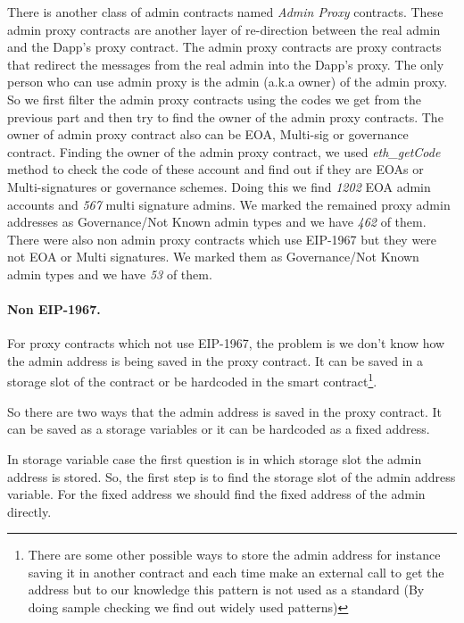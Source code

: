 There is another class of admin contracts named \textit{Admin Proxy} contracts. These admin proxy contracts are another layer of re-direction between the real admin and the Dapp's proxy contract. The admin proxy contracts are proxy contracts that redirect the messages from the real admin into the Dapp's proxy. The only person who can use admin proxy is the admin (a.k.a owner) of the admin proxy. So we first filter the admin proxy contracts using the codes we get from the previous part and then try to find the owner of the admin proxy contracts. The owner of admin proxy contract also can be EOA, Multi-sig or governance contract. Finding the owner of the admin proxy contract, we used \textit{eth\_getCode} method to check the code of these account and find out if they are EOAs or Multi-signatures or governance schemes. Doing this we find \textit{1202} EOA admin accounts and \textit{567} multi signature admins. We marked the remained proxy admin addresses as Governance/Not Known admin types and we have \textit{462} of them. There were also non admin proxy contracts which use EIP-1967 but they were not EOA or Multi signatures. We marked them as Governance/Not Known admin types and we have \textit{53} of them.


\paragraph{Non EIP-1967.}


For proxy contracts which not use EIP-1967, the problem is we don't know how the admin address is being saved in the proxy contract. It can be saved in a storage slot of the contract or be hardcoded in the smart contract\footnote{There are some other possible ways to store the admin address for instance saving it in another contract and each time make an external call to get the address but to our knowledge this pattern is not used as a standard (By doing sample checking we find out widely used patterns)}. 

So there are two ways that the admin address is saved in the proxy contract. It can be saved as a storage variables or it can be hardcoded as a fixed address.

In storage variable case the first question is in which storage slot the admin address is stored. So, the first step is to find the storage slot of the admin address variable. %
For the fixed address we should find the fixed address of the admin directly.


